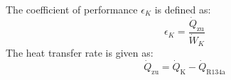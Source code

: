 The coefficient of performance \( \epsilon_K \) is defined as:  
\[
\epsilon_K = \frac{\dot{Q}_{\text{zu}}}{\dot{W}_K}
\]  
The heat transfer rate is given as:  
\[
\dot{Q}_{\text{zu}} = \dot{Q}_{\text{K}} - \dot{Q}_{\text{R134a}}
\]